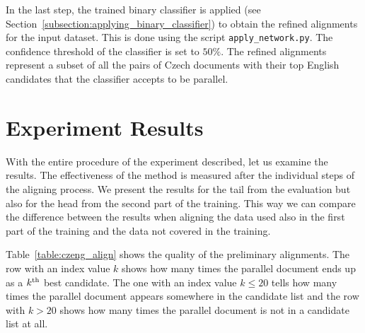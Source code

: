 In the last step, the trained binary classifier is applied  (see Section~\ref{subsection:applying_binary_classifier}) to obtain the refined alignments for the input dataset. This is done using the script \texttt{apply\_network.py}. The confidence threshold of the classifier is set to $50\%$. The refined alignments represent a subset of all the pairs of Czech documents with their top English candidates that the classifier accepts to be parallel.

\section{Experiment Results}
\label{section:czeng_experiment_results}

With the entire procedure of the experiment described, let us examine the results. The effectiveness of the method is measured after the individual steps of the aligning process. We present the results for the tail from the evaluation but also for the head from the second part of the training. This way we can compare the difference between the results when aligning the data used also in the first part of the training and the data not covered in the training.

Table~\ref{table:czeng_align} shows the quality of the preliminary alignments. The row with an index value $k$ shows how many times the parallel document ends up as a $k\textsuperscript{th}$ best candidate. The one with an index value $k \leq 20$ tells how many times the parallel document appears somewhere in the candidate list and the row with $k > 20$ shows how many times the parallel document is not in a candidate list at all. 

